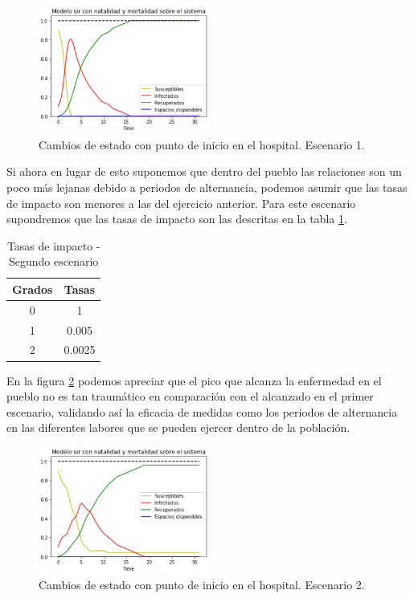 \begin{figure}[h]
  \centering
    \includegraphics[width=0.5\textwidth]{Imagenes/metricas1.PNG}
    \caption{Cambios de estado con punto de inicio en el hospital. Escenario 1.}
    \label{fig:metricas1}
\end{figure}

Si ahora en lugar de esto suponemos que dentro del pueblo las relaciones son un poco más lejanas debido a periodos de alternancia, podemos asumir que las tasas de impacto son menores a las del ejercicio anterior. Para este escenario supondremos que las tasas de impacto son las descritas en la tabla \ref{tab:tasasDeImpacto2}.

\begin{table}[h]
\begin{center}
\begin{tabular}{| c | c |}
\hline
Grados & Tasas \\ \hline
0 & 1 \\
1 & 0.005 \\
2 & 0.0025 \\\hline
\end{tabular}
\caption{Tasas de impacto - Segundo escenario}
\label{tab:tasasDeImpacto2}
\end{center}
\end{table}

En la figura \ref{fig:metricas2} podemos apreciar que el pico que alcanza la enfermedad en el pueblo no es tan traumático en comparación con el alcanzado en el primer escenario, validando así la eficacia de medidas como los periodos de alternancia en las diferentes labores que se pueden ejercer dentro de la población.

\newpage

\begin{figure}[h]
  \centering
    \includegraphics[width=0.5\textwidth]{Imagenes/metricas2.PNG}
    \caption{Cambios de estado con punto de inicio en el hospital. Escenario 2.}
    \label{fig:metricas2}
\end{figure}

